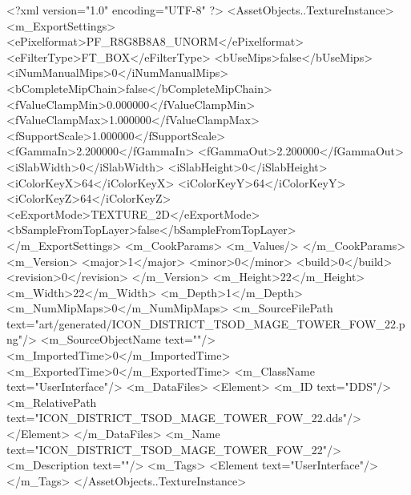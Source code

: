 <?xml version="1.0" encoding="UTF-8" ?>
<AssetObjects..TextureInstance>
	<m_ExportSettings>
		<ePixelformat>PF_R8G8B8A8_UNORM</ePixelformat>
		<eFilterType>FT_BOX</eFilterType>
		<bUseMips>false</bUseMips>
		<iNumManualMips>0</iNumManualMips>
		<bCompleteMipChain>false</bCompleteMipChain>
		<fValueClampMin>0.000000</fValueClampMin>
		<fValueClampMax>1.000000</fValueClampMax>
		<fSupportScale>1.000000</fSupportScale>
		<fGammaIn>2.200000</fGammaIn>
		<fGammaOut>2.200000</fGammaOut>
		<iSlabWidth>0</iSlabWidth>
		<iSlabHeight>0</iSlabHeight>
		<iColorKeyX>64</iColorKeyX>
		<iColorKeyY>64</iColorKeyY>
		<iColorKeyZ>64</iColorKeyZ>
		<eExportMode>TEXTURE_2D</eExportMode>
		<bSampleFromTopLayer>false</bSampleFromTopLayer>
	</m_ExportSettings>
	<m_CookParams>
		<m_Values/>
	</m_CookParams>
	<m_Version>
		<major>1</major>
		<minor>0</minor>
		<build>0</build>
		<revision>0</revision>
	</m_Version>
	<m_Height>22</m_Height>
	<m_Width>22</m_Width>
	<m_Depth>1</m_Depth>
	<m_NumMipMaps>0</m_NumMipMaps>
	<m_SourceFilePath text="art/generated/ICON_DISTRICT_TSOD_MAGE_TOWER_FOW_22.png"/>
	<m_SourceObjectName text=""/>
	<m_ImportedTime>0</m_ImportedTime>
	<m_ExportedTime>0</m_ExportedTime>
	<m_ClassName text="UserInterface"/>
	<m_DataFiles>
		<Element>
			<m_ID text="DDS"/>
			<m_RelativePath text="ICON_DISTRICT_TSOD_MAGE_TOWER_FOW_22.dds"/>
		</Element>
	</m_DataFiles>
	<m_Name text="ICON_DISTRICT_TSOD_MAGE_TOWER_FOW_22"/>
	<m_Description text=""/>
	<m_Tags>
		<Element text="UserInterface"/>
	</m_Tags>
</AssetObjects..TextureInstance>
